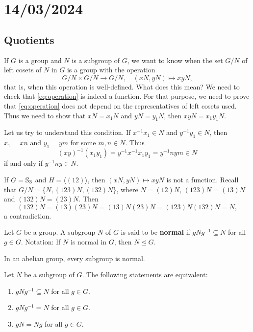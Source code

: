 \section{14/03/2024}

\subsection{Quotients}

If $G$ is a group and $N$ is a subgroup of $G$, we want to know
when the set $G/N$ of left cosets 
of $N$ in $G$ is a group with 
the operation 
\begin{equation}
\label{eq:operation}
G/N\times G/N\to G/N,\quad 
(xN,yN)\mapsto xyN,
\end{equation}
that is, when this operation 
is well-defined. 
What does this mean? We need to check that
\eqref{eq:operation} is indeed a function. 
For that purpose, we need to prove that
\eqref{eq:operation} does not depend on the representatives of left
cosets used. Thus we need to show that 
$xN=x_1N$ and $yN=y_1N$, then 
$xyN=x_1y_1N$. 

Let us try to understand this condition. If $x^{-1}x_1\in N$ and 
$y^{-1}y_1\in N$, then $x_1=xn$ and $y_1=ym$ for some 
$m,n\in N$. Thus 
\[
(xy)^{-1}(x_1y_1)=y^{-1}x^{-1}x_1y_1=y^{-1}nym\in N
\]
if and only if $y^{-1}ny\in N$.

\begin{example}
If $G=\mathbb{S}_3$ and $H=\langle (12)\rangle$, then $(xN,yN)\mapsto xyN$ is not a function. Recall that 
$G/N=\{N,(123)N,(132)N\}$, where 
$N=(12)N$, $(123)N=(13)N$ and $(132)N=(23)N$. Then 
\[
(132)N=(13)(23)N=(13)N(23)N=(123)N(132)N=N,
\]
a contradiction.
\end{example}

\begin{definition}
    Let $G$ be a group. 
    A subgroup $N$ of $G$ is said to be \textbf{normal} if $gNg^{-1}\subseteq N$ for all $g\in G$.
    Notation: If $N$ is normal in $G$, then $N\unlhd G$.
\end{definition}

In an abelian group, every subgroup is normal. 

\begin{proposition}
\label{pro:normalidad}
Let $N$ be a subgroup of $G$. 
The following statements are equivalent:
\begin{enumerate}
        \item $gNg^{-1}\subseteq N$ for all $g\in G$.
        \item $gNg^{-1}=N$ for all $g\in G$.
        \item $gN=Ng$ for all $g\in G$.
\end{enumerate}
\end{proposition}

